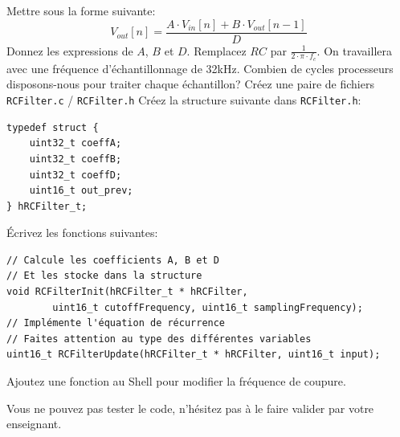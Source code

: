 \documentclass[12pt,%
addpoints,%
]{exam}
\begin{document}
\begin{questions}
\begin{minipage}[c]{.66\linewidth}
		\vspace{1em}
    \end{minipage}
	Mettre sous la forme suivante:
	$$V_{out}[n] = \frac{A \cdot V_{in}[n] + B \cdot V_{out}[n-1]}{D}$$
	\question Donnez les expressions de $A$, $B$ et $D$.
		Remplacez $RC$ par $\frac{1}{2 \cdot \pi \cdot f_c}$.
	\question On travaillera avec une fréquence d'échantillonnage de 32kHz. Combien de cycles processeurs disposons-nous pour traiter chaque échantillon?
	\question Créez une paire de fichiers \texttt{RCFilter.c} / \texttt{RCFilter.h}
	\question Créez la structure suivante dans \texttt{RCFilter.h}:
	\begin{verbatim}
typedef struct {
    uint32_t coeffA;
    uint32_t coeffB;
    uint32_t coeffD;
    uint16_t out_prev;
} hRCFilter_t;
	\end{verbatim}
    \question Écrivez les fonctions suivantes:
    \begin{verbatim} 
// Calcule les coefficients A, B et D
// Et les stocke dans la structure
void RCFilterInit(hRCFilter_t * hRCFilter, 
        uint16_t cutoffFrequency, uint16_t samplingFrequency);
// Implémente l'équation de récurrence
// Faites attention au type des différentes variables
uint16_t RCFilterUpdate(hRCFilter_t * hRCFilter, uint16_t input);
    \end{verbatim}
	\question Ajoutez une fonction au Shell pour modifier la fréquence de coupure.

	\question Vous ne pouvez pas tester le code, n'hésitez pas à le faire valider par votre enseignant.
\end{questions}


\newpage
\end{document}
